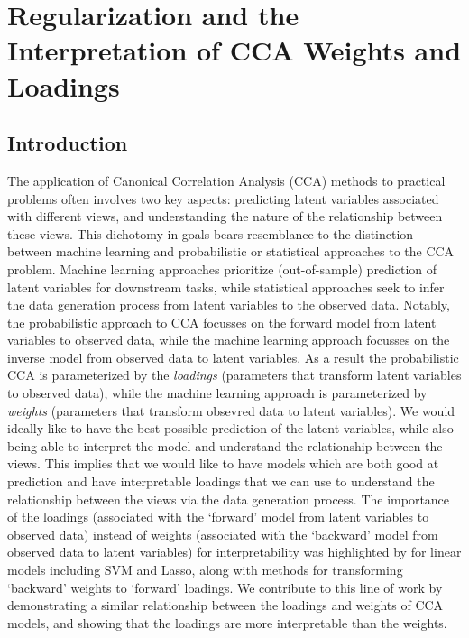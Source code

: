 \graphicspath{{chapters/loadings/}}
\chapter{Regularization and the Interpretation of CCA Weights and Loadings}\label{chap:loadings}
\minitoc
\section{Introduction}

The application of Canonical Correlation Analysis (CCA) methods to practical problems often involves two key aspects: predicting latent variables associated with different views, and understanding the nature of the relationship between these views.
This dichotomy in goals bears resemblance to the distinction between machine learning and probabilistic or statistical approaches to the CCA problem.
Machine learning approaches prioritize (out-of-sample) prediction of latent variables for downstream tasks, while statistical approaches seek to infer the data generation process from latent variables to the observed data.
Notably, the probabilistic approach to CCA focusses on the forward model from latent variables to observed data, while the machine learning approach focusses on the inverse model from observed data to latent variables.
As a result the probabilistic CCA is parameterized by the \textit{loadings} (parameters that transform latent variables to observed data), while the machine learning approach is parameterized by \textit{weights} (parameters that transform obsevred data to latent variables).
We would ideally like to have the best possible prediction of the latent variables, while also being able to interpret the model and understand the relationship between the views.
This implies that we would like to have models which are both good at prediction and have interpretable loadings that we can use to understand the relationship between the views via the data generation process.
The importance of the loadings (associated with the `forward' model from latent variables to observed data) instead of weights (associated with the `backward' model from observed data to latent variables) for interpretability was highlighted by \cite{haufe2014interpretation} for linear models including SVM and Lasso, along with methods for transforming `backward' weights to `forward' loadings.
We contribute to this line of work by demonstrating a similar relationship between the loadings and weights of CCA models, and showing that the loadings are more interpretable than the weights.

